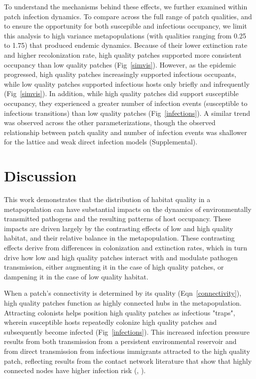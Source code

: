 \documentclass{article}
\begin{document}
To understand the mechanisms behind these effects, we further examined within patch infection dynamics.  To compare across the full range of patch qualities, and to ensure the opportunity for both suscepible and infectious occupancy, we limit this analysis to high variance metapopulations (with qualities ranging from 0.25 to 1.75) that produced endemic dynamics.  Because of their lower extinction rate and higher recolonization rate, high quality patches supported more consistent occupancy than low quality patches (Fig~\ref{simvis}).  However, as the epidemic progressed, high quality patches increasingly supported infectious occupants, while low quality patches supported infectious hosts only briefly and infrequently (Fig~\ref{simvis}).  In addition, while high quality patches did support susceptible occupancy, they experienced a greater number of infection events (susceptible to infectious transitions) than low quality patches (Fig~\ref{infections}).  A similar trend was observed across the other parameterizations, though the observed relationship between patch quality and number of infection events was shallower for the lattice and weak direct infection models (Supplemental).


\section{Discussion}
\label{discussion} 

This work demonstrates that the distribution of habitat quality in a metapopulation can have substantial impacts on the dynamics of environmentally transmitted pathogens and the resulting patterns of host occupancy.  These impacts are driven largely by the contrasting effects of low and high quality habitat, and their relative balance in the metapopulation.  These contrasting effects derive from differences in colonization and extinction rates, which in turn drive how low and high quality patches interact with and modulate pathogen transmission, either augmenting it in the case of high quality patches, or dampening it in the case of low quality habitat.   

When a patch's connectivity is determined by its quality (Eqn~\ref{connectivity}), high quality patches function as highly connected hubs in the metapopulation.  Attracting colonists helps position high quality patches as infectious "traps", wherein susceptible hosts repeatedly colonize high quality patches and subsequently become infected (Fig~\ref{infections}).  This increased infection pressure results from both transmission from a persistent environmental reservoir and from direct transmission from infectious immigrants attracted to the high quality patch, reflecting results from the contact network literature that show that highly connected nodes have higher infection risk (\cite{Christley2005}, \cite{Keeling2005}).  
\end{document}
